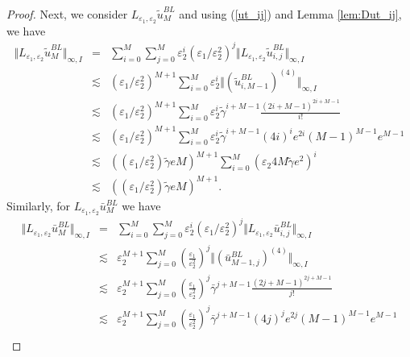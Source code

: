 \documentclass[12pt]{article}
\begin{document}
\begin{proof}
Next, we consider $L_{\varepsilon_1, \varepsilon_2} \tilde{u}_M^{BL}$ and using (\ref{ut_ij}) and Lemma \ref{lem:Dut_ij}, we have
%
\begin{eqnarray*}
\Vert L_{\varepsilon_1, \varepsilon_2} \tilde{u}_M^{BL} \Vert _{\infty ,I} &=& \sum_{i=0}^M \sum_{j=0}^M \varepsilon_2^i (\varepsilon_1 / \varepsilon_2^2)^j \Vert L_{\varepsilon_1, \varepsilon_2} \tilde{u}^{BL}_{i,j} \Vert _{\infty ,I} \\
&\lesssim& (\varepsilon_1 / \varepsilon_2^2)^{M+1} \sum_{i=0}^M \varepsilon_2^i \Vert \left(\tilde{u}^{BL}_{i,M-1}\right)^{(4)} \Vert _{\infty ,I} \\
&\lesssim& (\varepsilon_1 / \varepsilon_2^2)^{M+1} \sum_{i=0}^M \varepsilon_2^i \tilde{\gamma }^{i+M-1} \frac{(2i+M-1)^{2i+M-1}}{i!} \\
&\lesssim& (\varepsilon_1 / \varepsilon_2^2)^{M+1} \sum_{i=0}^M \varepsilon_2^i \tilde{\gamma }^{i+M-1} (4i)^{i} e^{2i} (M-1)^{M-1} e^{M-1} \\
&\lesssim& \left( (\varepsilon_1 / \varepsilon_2^2) \tilde{\gamma } e M \right) ^{M+1} \sum_{i=0}^M (\varepsilon_2 4M \tilde{\gamma } e^2)^i \\
&\lesssim& \left( (\varepsilon_1 / \varepsilon_2^2) \tilde{\gamma } e M \right) ^{M+1}.
\end{eqnarray*}
%
Similarly, for $L_{\varepsilon_1, \varepsilon_2} \bar{u}_M^{BL}$ we have
%
\begin{eqnarray*}
\Vert L_{\varepsilon_1, \varepsilon_2} \bar{u}_M^{BL} \Vert _{\infty ,I} &=& \sum_{i=0}^M \sum_{j=0}^M \varepsilon_2^i (\varepsilon_1 / \varepsilon_2^2)^j \Vert L_{\varepsilon_1, \varepsilon_2} \bar{u}^{BL}_{i,j} \Vert _{\infty ,I} \\
&\lesssim& \varepsilon_2^{M+1} \sum_{j=0}^M \left( \frac{\varepsilon_1}{\varepsilon_2^2}\right)^j \Vert \left(\bar{u}_{M-1,j}^{BL}\right)^{(4)}\Vert_{\infty,I} \\
&\lesssim& \varepsilon_2^{M+1} \sum_{j=0}^M \left( \frac{\varepsilon_1}{\varepsilon_2^2}\right)^j 
 \bar{\gamma }^{j+M-1} \frac{(2j+M-1)^{2j+M-1}}{j!} \\
&\lesssim& \varepsilon_2^{M+1} \sum_{j=0}^M \left( \frac{\varepsilon_1}{\varepsilon_2^2}\right)^j 
 \bar{\gamma }^{j+M-1} (4j)^{j} e^{2j} (M-1)^{M-1} e^{M-1} \\

\end{eqnarray*}
\end{proof}
\end{document}
